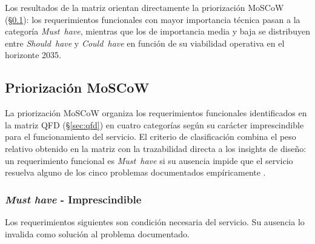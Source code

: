 Los resultados de la matriz orientan directamente la priorización
MoSCoW (§\ref{sec:moscow}): los requerimientos funcionales con mayor
importancia técnica pasan a la categoría \textit{Must~have}, mientras
que los de importancia media y baja se distribuyen entre
\textit{Should~have} y \textit{Could~have} en función de su
viabilidad operativa en el horizonte 2035.

\subsection{Priorización MoSCoW}\label{sec:moscow}

La priorización MoSCoW organiza los requerimientos funcionales
identificados en la matriz QFD (§\ref{sec:qfd}) en cuatro categorías
según su carácter imprescindible para el funcionamiento del servicio.
El criterio de clasificación combina el peso relativo obtenido en la
matriz con la trazabilidad directa a los insights de diseño: un
requerimiento funcional es \textit{Must~have} si su ausencia impide
que el servicio resuelva alguno de los cinco problemas documentados
empíricamente \parencite{LouridoRegueira2026}.

\subsubsection{\textit{Must have} - Imprescindible}
\label{sec:moscow-must}

Los requerimientos siguientes son condición necesaria del servicio.
Su ausencia lo invalida como solución al problema documentado.

